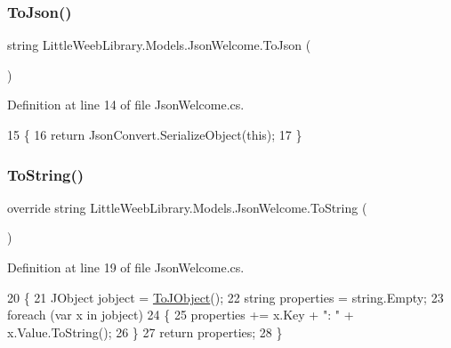 \subsubsection{\texorpdfstring{To\+Json()}{ToJson()}}
{\footnotesize\ttfamily string Little\+Weeb\+Library.\+Models.\+Json\+Welcome.\+To\+Json (\begin{DoxyParamCaption}{ }\end{DoxyParamCaption})}



Definition at line 14 of file Json\+Welcome.\+cs.


\begin{DoxyCode}
15         \{
16             \textcolor{keywordflow}{return} JsonConvert.SerializeObject(\textcolor{keyword}{this});
17         \}
\end{DoxyCode}
\mbox{\label{class_little_weeb_library_1_1_models_1_1_json_welcome_a762f38491c69ca0d0c2c17e4582a145c}} 
\subsubsection{\texorpdfstring{To\+String()}{ToString()}}
{\footnotesize\ttfamily override string Little\+Weeb\+Library.\+Models.\+Json\+Welcome.\+To\+String (\begin{DoxyParamCaption}{ }\end{DoxyParamCaption})}



Definition at line 19 of file Json\+Welcome.\+cs.


\begin{DoxyCode}
20         \{
21             JObject jobject = \mbox{\hyperlink{class_little_weeb_library_1_1_models_1_1_json_welcome_a964f2548a650181c962a0cf9027ba119}{ToJObject}}();
22             \textcolor{keywordtype}{string} properties = \textcolor{keywordtype}{string}.Empty;
23             \textcolor{keywordflow}{foreach} (var x \textcolor{keywordflow}{in} jobject)
24             \{
25                 properties += x.Key + \textcolor{stringliteral}{": "} + x.Value.ToString();
26             \}
27             \textcolor{keywordflow}{return} properties;
28         \}
\end{DoxyCode}
\mbox{\label{class_little_weeb_library_1_1_models_1_1_json_welcome_a964f2548a650181c962a0cf9027ba119}} 

